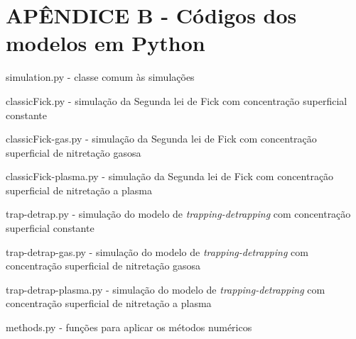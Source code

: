 \section*{APÊNDICE B - Códigos dos modelos em Python}
\label{sec:anexo-codigos}
\begin{changemargin}{-2cm}{-1.5cm}    

\noindent simulation.py - classe comum às simulações

\noindent classicFick.py - simulação da Segunda lei de Fick com concentração superficial constante

\noindent classicFick-gas.py - simulação da Segunda lei de Fick com concentração superficial de nitretação gasosa

\noindent classicFick-plasma.py - simulação da Segunda lei de Fick com concentração superficial de nitretação a plasma

\noindent trap-detrap.py - simulação do modelo de \textit{trapping-detrapping} com concentração superficial constante

\noindent trap-detrap-gas.py - simulação do modelo de \textit{trapping-detrapping} com concentração superficial de nitretação gasosa


\noindent trap-detrap-plasma.py - simulação do modelo de \textit{trapping-detrapping} com concentração superficial de nitretação a plasma

\noindent methods.py -  funções para aplicar os métodos numéricos



\end{changemargin}